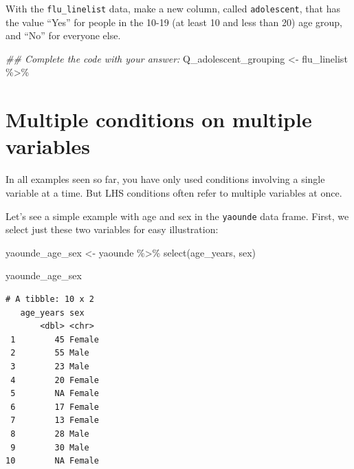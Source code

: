 \documentclass[
  letterpaper,
  DIV=11,
  numbers=noendperiod]{scrreprt}
\newenvironment{Shaded}{\begin{snugshade}}{\end{snugshade}}
\newcommand{\DocumentationTok}[1]{\textcolor[rgb]{0.37,0.37,0.37}{\textit{#1}}}
\newcommand{\FunctionTok}[1]{\textcolor[rgb]{0.28,0.35,0.67}{#1}}
\newcommand{\NormalTok}[1]{\textcolor[rgb]{0.00,0.23,0.31}{#1}}
\newcommand{\OtherTok}[1]{\textcolor[rgb]{0.00,0.23,0.31}{#1}}
\newcommand{\SpecialCharTok}[1]{\textcolor[rgb]{0.37,0.37,0.37}{#1}}
\begin{document}
\begin{tcolorbox}[enhanced jigsaw, titlerule=0mm, colback=white, left=2mm, breakable, opacitybacktitle=0.6, colbacktitle=quarto-callout-tip-color!10!white, colframe=quarto-callout-tip-color-frame, bottomtitle=1mm, opacityback=0, coltitle=black, arc=.35mm, toptitle=1mm, title=\textcolor{quarto-callout-tip-color}{\faLightbulb}\hspace{0.5em}{Practice}, leftrule=.75mm, toprule=.15mm, bottomrule=.15mm, rightrule=.15mm]

With the \texttt{flu\_linelist} data, make a new column, called
\texttt{adolescent}, that has the value ``Yes'' for people in the 10-19
(at least 10 and less than 20) age group, and ``No'' for everyone else.

\begin{Shaded}
\begin{Highlighting}[]
\DocumentationTok{\#\# Complete the code with your answer:}
\NormalTok{Q\_adolescent\_grouping }\OtherTok{\textless{}{-}} 
\NormalTok{  flu\_linelist }\SpecialCharTok{\%\textgreater{}\%} 
\end{Highlighting}
\end{Shaded}

\end{tcolorbox}

\section{Multiple conditions on multiple
variables}\label{multiple-conditions-on-multiple-variables}

In all examples seen so far, you have only used conditions involving a
single variable at a time. But LHS conditions often refer to multiple
variables at once.

Let's see a simple example with age and sex in the \texttt{yaounde} data
frame. First, we select just these two variables for easy illustration:

\begin{Shaded}
\begin{Highlighting}[]
\NormalTok{yaounde\_age\_sex }\OtherTok{\textless{}{-}} 
\NormalTok{  yaounde }\SpecialCharTok{\%\textgreater{}\%} 
  \FunctionTok{select}\NormalTok{(age\_years, sex)}

\NormalTok{yaounde\_age\_sex}
\end{Highlighting}
\end{Shaded}

\begin{verbatim}
# A tibble: 10 x 2
   age_years sex   
       <dbl> <chr> 
 1        45 Female
 2        55 Male  
 3        23 Male  
 4        20 Female
 5        NA Female
 6        17 Female
 7        13 Female
 8        28 Male  
 9        30 Male  
10        NA Female
\end{verbatim}
\end{document}
